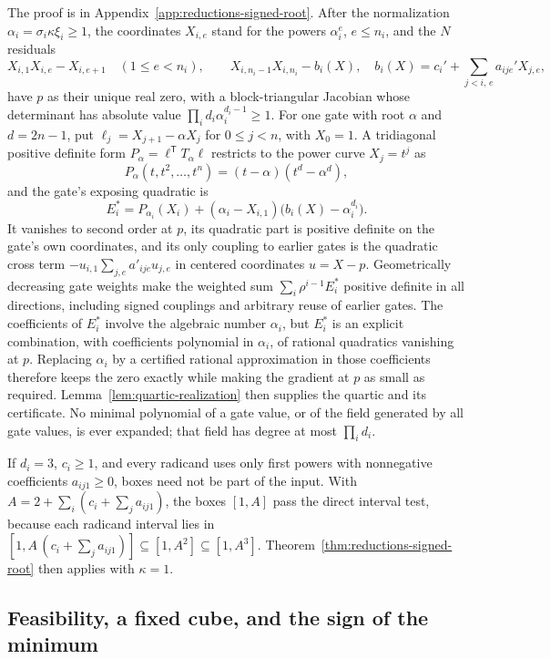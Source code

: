 The proof is in Appendix~\ref{app:reductions-signed-root}. After the
normalization $\alpha_i=\sigma_i\kappa\xi_i\ge1$, the coordinates $X_{i,e}$
stand for the powers $\alpha_i^e$, $e\le n_i$, and the $N$ residuals
\[
 X_{i,1}X_{i,e}-X_{i,e+1}\quad(1\le e<n_i),\qquad
 X_{i,n_i-1}X_{i,n_i}-b_i(X),\quad
 b_i(X)=c_i'+\sum_{j<i,\,e}a_{ije}'X_{j,e},
\]
have $p$ as their unique real zero, with a block-triangular Jacobian whose
determinant has absolute value $\prod_id_i\alpha_i^{d_i-1}\ge1$. For one gate with root $\alpha$ and
$d=2n-1$, put $\ell_j=X_{j+1}-\alpha X_j$ for $0\le j<n$, with $X_0=1$. A
tridiagonal positive definite form $P_\alpha=\ell^{\mathsf T}T_\alpha\ell$
restricts to the power curve $X_j=t^j$ as
\[
 P_\alpha(t,t^2,\ldots,t^n)=(t-\alpha)(t^d-\alpha^d),
\]
and the gate's exposing quadratic is
\[
 E_i^*=P_{\alpha_i}(X_i)+(\alpha_i-X_{i,1})\bigl(b_i(X)-\alpha_i^{d_i}\bigr).
\]
It vanishes to second order at $p$, its quadratic part is positive definite
on the gate's own coordinates, and its only coupling to earlier gates is the
quadratic cross term $-u_{i,1}\sum_{j,e}a'_{ije}u_{j,e}$ in centered
coordinates $u=X-p$. Geometrically decreasing gate weights make the weighted
sum $\sum_i\rho^{i-1}E_i^*$ positive definite in all directions, including
signed couplings and arbitrary reuse of earlier gates. The coefficients of
$E_i^*$ involve the algebraic number $\alpha_i$, but $E_i^*$ is an explicit
combination, with coefficients polynomial in $\alpha_i$, of rational quadratics
vanishing at $p$. Replacing $\alpha_i$ by a certified rational approximation in
those coefficients therefore keeps the zero exactly while making the gradient
at $p$ as small as required. Lemma~\ref{lem:quartic-realization} then supplies
the quartic and its certificate. No minimal polynomial of a gate value, or of
the field generated by all gate values, is ever expanded; that field has degree
at most $\prod_id_i$.

\begin{remark}
\label{rem:reductions-monotone}
If $d_i=3$, $c_i\ge1$, and every radicand uses only first powers with
nonnegative coefficients $a_{ij1}\ge0$, boxes need not be part of the input. With
$A=2+\sum_i(c_i+\sum_ja_{ij1})$, the boxes $[1,A]$ pass the direct interval
test, because each radicand interval lies in $[1,A\,(c_i+\sum_ja_{ij1})]
\subseteq[1,A^2]\subseteq[1,A^3]$. Theorem~\ref{thm:reductions-signed-root}
then applies with $\kappa=1$.
\end{remark}

\subsection{Feasibility, a fixed cube, and the sign of the minimum}
\label{sec:reductions-consequences}

